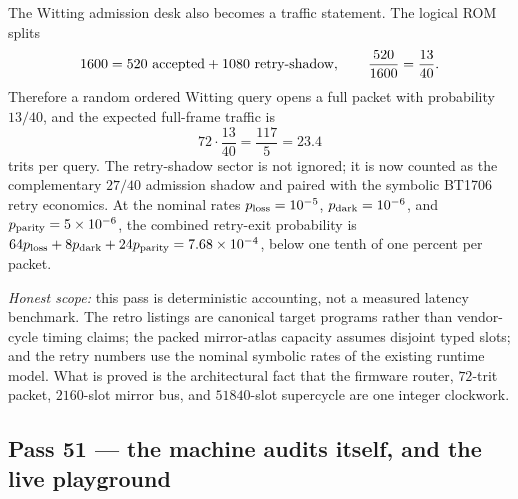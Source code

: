 \documentclass[11pt]{article}
\begin{document}
The Witting admission desk also becomes a traffic statement.  The logical ROM
splits
\[
  1600 = 520\ \hbox{accepted} + 1080\ \hbox{retry-shadow},
  \qquad \frac{520}{1600}=\frac{13}{40}.
\]
Therefore a random ordered Witting query opens a full packet with probability
\(13/40\), and the expected full-frame traffic is
\[
  72\cdot \frac{13}{40}=\frac{117}{5}=23.4
\]
trits per query.  The retry-shadow sector is not ignored; it is now counted as
the complementary \(27/40\) admission shadow and paired with the symbolic
BT1706 retry economics.  At the nominal rates \(p_{\rm loss}=10^{-5}\),
\(p_{\rm dark}=10^{-6}\), and \(p_{\rm parity}=5\times10^{-6}\), the combined
retry-exit probability is \(64p_{\rm loss}+8p_{\rm dark}+24p_{\rm parity}
=7.68\times10^{-4}\), below one tenth of one percent per packet.

\emph{Honest scope:} this pass is deterministic accounting, not a measured
latency benchmark.  The retro listings are canonical target programs rather
than vendor-cycle timing claims; the packed mirror-atlas capacity assumes
disjoint typed slots; and the retry numbers use the nominal symbolic rates of
the existing runtime model.  What is proved is the architectural fact that the
firmware router, \(72\)-trit packet, \(2160\)-slot mirror bus, and
\(51840\)-slot supercycle are one integer clockwork.

\subsection{Pass 51 --- the machine audits itself, and the live playground}
\label{sec:capstone-fiftyone}
\end{document}

